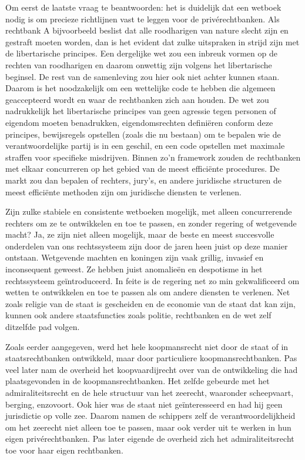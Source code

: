\documentclass[
  a5paper,
  smalldemyvopaper,10pt,twoside,onecolumn,openright,extrafontsizes,hidelinks]{memoir}
\begin{document}
Om eerst de laatste vraag te beantwoorden: het is duidelijk dat een
wetboek nodig is om precieze richtlijnen vast te leggen voor de
privérechtbanken. Als rechtbank A bijvoorbeeld beslist dat alle
roodharigen van nature slecht zijn en gestraft moeten worden, dan is het
evident dat zulke uitspraken in strijd zijn met de libertarische
principes. Een dergelijke wet zou een inbreuk vormen op de rechten van
roodharigen en daarom onwettig zijn volgens het libertarische beginsel.
De rest van de samenleving zou hier ook niet achter kunnen staan. Daarom
is het noodzakelijk om een wettelijke code te hebben die algemeen
geaccepteerd wordt en waar de rechtbanken zich aan houden. De wet zou
nadrukkelijk het libertarische principes van geen agressie tegen
personen of eigendom moeten benadrukken, eigendomsrechten definiëren
conform deze principes, bewijsregels opstellen (zoals die nu bestaan) om
te bepalen wie de verantwoordelijke partij is in een geschil, en een
code opstellen met maximale straffen voor specifieke misdrijven. Binnen
zo'n framework zouden de rechtbanken met elkaar concurreren op het
gebied van de meest efficiënte procedures. De markt zou dan bepalen of
rechters, jury's, en andere juridische structuren de meest efficiënte
methoden zijn om juridische diensten te verlenen.

Zijn zulke stabiele en consistente wetboeken mogelijk, met alleen
concurrerende rechters om ze te ontwikkelen en toe te passen, en zonder
regering of wetgevende macht? Ja, ze zijn niet alleen mogelijk, maar de
beste en meest succesvolle onderdelen van ons rechtssysteem zijn door de
jaren heen juist op deze manier ontstaan. Wetgevende machten en koningen
zijn vaak grillig, invasief en inconsequent geweest. Ze hebben juist
anomalieën en despotisme in het rechtssysteem geïntroduceerd. In feite
is de regering net zo min gekwalificeerd om wetten te ontwikkelen en toe
te passen als om andere diensten te verlenen. Net zoals religie van de
staat is gescheiden en de economie van de staat dat kan zijn, kunnen ook
andere staatsfuncties zoals politie, rechtbanken en de wet zelf
ditzelfde pad volgen.

Zoals eerder aangegeven, werd het hele koopmansrecht niet door de staat
of in staatsrechtbanken ontwikkeld, maar door particuliere
koopmansrechtbanken. Pas veel later nam de overheid het koopvaardijrecht
over van de ontwikkeling die had plaatsgevonden in de
koopmansrechtbanken. Het zelfde gebeurde met het admiraliteitsrecht en
de hele structuur van het zeerecht, waaronder scheepvaart, berging,
enzovoort. Ook hier was de staat niet geïnteresseerd en had hij geen
jurisdictie op volle zee. Daarom namen de schippers zelf de
verantwoordelijkheid om het zeerecht niet alleen toe te passen, maar ook
verder uit te werken in hun eigen privérechtbanken. Pas later eigende de
overheid zich het admiraliteitsrecht toe voor haar eigen rechtbanken.
\end{document}

